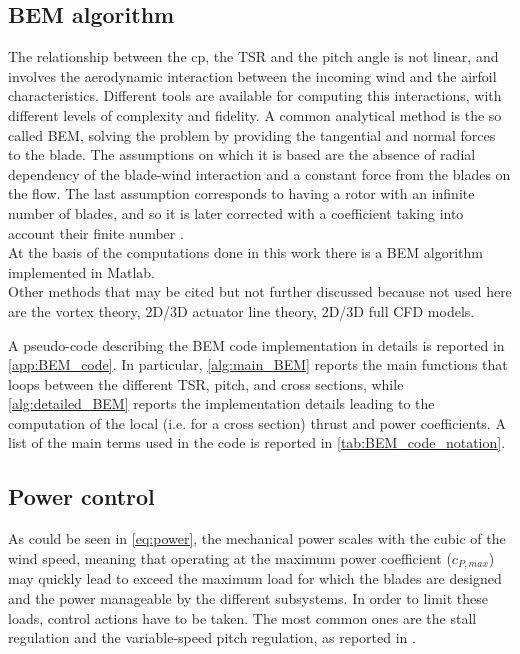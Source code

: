 \subsection{BEM algorithm}\label{subsec:BEM_algorithm}
The relationship between the \acrshort{cp}, the \acrshort{TSR} and the pitch angle is not linear, and involves the aerodynamic interaction between the incoming wind and the airfoil characteristics. Different tools are available for computing this interactions, with different levels of complexity and fidelity. A common analytical method is the so called \acrfull{BEM}, solving the problem by providing the tangential and normal forces to the blade. The assumptions on which it is based are the absence of radial dependency of the blade-wind interaction and a constant force from the blades on the flow. The last assumption corresponds to having a rotor with an infinite number of blades, and so it is later corrected with a coefficient taking into account their finite number \cite{Aerodynamics_of_wind_turbines}.\\
At the basis of the computations done in this work there is a \acrshort{BEM} algorithm implemented in Matlab.\\
Other methods that may be cited but not further discussed because not used here are the vortex theory, 2D/3D actuator line theory, 2D/3D full CFD models.

A pseudo-code describing the BEM code implementation in details is reported in \autoref{app:BEM_code}. In particular, \autoref{alg:main_BEM} reports the main functions that loops between the different TSR, pitch, and cross sections, while \autoref{alg:detailed_BEM} reports the implementation details leading to the computation of the local (i.e. for a cross section) thrust and power coefficients. A list of the main terms used in the code is reported in \autoref{tab:BEM_code_notation}. 

\subsection{Power control}
As could be seen in \autoref{eq:power}, the mechanical power scales with the cubic of the wind speed, meaning that operating at the maximum power coefficient ($c_{P, max}$) may quickly lead to exceed the maximum load for which the blades are designed and the power manageable by the different subsystems. In order to limit these loads, control actions have to be taken. The most common ones are the stall regulation and the variable-speed pitch regulation, as reported in \cite{Aerodynamics_of_wind_turbines}.

